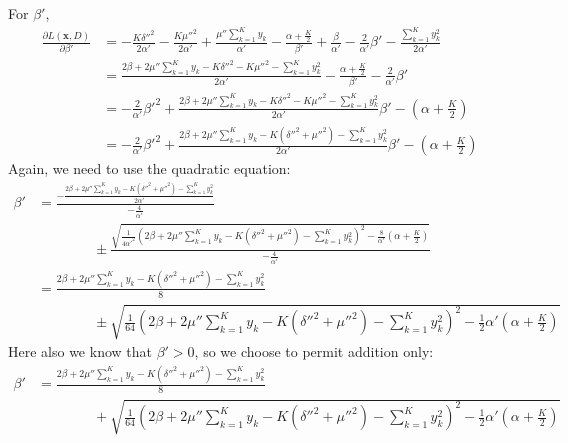 \documentclass[12pt]{article}
\begin{document}
\begin{appendices}
For $\beta'$,
\begin{align}
    \frac{\partial L(\bm{x}, D)}{\partial \beta'} &=
    - \frac{K\delta''^2}{2\alpha'} - \frac{K\mu''^2}{2\alpha'}
    + \frac{\mu''\sum_{k=1}^{K}y_{k}}{\alpha'}
    - \frac{\alpha + \frac{K}{2}}{\beta'}
    + \frac{\beta}{\alpha'} - \frac{2}{\alpha'}\beta'
    - \frac{\sum_{k=1}^{K} y_{k}^2}{2\alpha'}
    \nonumber \\
    &= \frac{2\beta + 2\mu''\sum_{k=1}^{K}y_{k}
    - K\delta''^2 - K\mu''^2
    - \sum_{k=1}^{K} y_{k}^2}{2\alpha'}
    - \frac{\alpha + \frac{K}{2}}{\beta'}
    - \frac{2}{\alpha'}\beta'
    \nonumber \\
    &=
    - \frac{2}{\alpha'}\beta'^2
    + \frac{2\beta + 2\mu''\sum_{k=1}^{K}y_{k}
    - K\delta''^2 - K\mu''^2
    - \sum_{k=1}^{K} y_{k}^2}{2\alpha'}\beta'
    - (\alpha + \frac{K}{2})
    \nonumber \\
    &=
    - \frac{2}{\alpha'}\beta'^2
    + \frac{2\beta + 2\mu''\sum_{k=1}^{K}y_{k}
    - K(\delta''^2 + \mu''^2)
    - \sum_{k=1}^{K} y_{k}^2}{2\alpha'}\beta'
    - (\alpha + \frac{K}{2})
    \nonumber
\end{align}
Again, we need to use the quadratic equation:
\begin{align}
    \beta' &= \frac{- \frac{2\beta + 2\mu''\sum_{k=1}^{K}y_{k} - K(\delta''^2 +
    \mu''^2) - \sum_{k=1}^{K} y_{k}^{2}}{2\alpha'}}{-\frac{4}{\alpha'}}
    \nonumber \\
    &\quad\quad\quad\quad
    \pm
    \frac{\sqrt{\frac{1}{4\alpha'^2}(2\beta + 2\mu''\sum_{k=1}^{K}y_{k} - K(\delta''^2 +
    \mu''^2) - \sum_{k=1}^{K} y_{k}^{2})^2 - \frac{8}{\alpha'}(\alpha +
    \frac{K}{2})}}
    {-\frac{4}{\alpha'}}
    \nonumber \\
    &= \frac{2\beta + 2\mu''\sum_{k=1}^{K}y_{k} - K(\delta''^2 +
    \mu''^2) - \sum_{k=1}^{K} y_{k}^{2}}{8}
    \nonumber \\
    &\quad\quad\quad\quad
    \pm
    \sqrt{\frac{1}{64}(2\beta + 2\mu''\sum_{k=1}^{K}y_{k} - K(\delta''^2 +
    \mu''^2) - \sum_{k=1}^{K} y_{k}^{2})^2 - \frac{1}{2}\alpha'(\alpha +
    \frac{K}{2})}
    \nonumber
\end{align}
Here also we know that $\beta' > 0$, so we choose to permit addition only:
\begin{align}
    \beta' &= \frac{2\beta + 2\mu''\sum_{k=1}^{K}y_{k} - K(\delta''^2 +
    \mu''^2) - \sum_{k=1}^{K} y_{k}^{2}}{8}
    \nonumber \\
    &\quad\quad\quad\quad
    +
    \sqrt{\frac{1}{64}(2\beta + 2\mu''\sum_{k=1}^{K}y_{k} - K(\delta''^2 +
    \mu''^2) - \sum_{k=1}^{K} y_{k}^{2})^2 - \frac{1}{2}\alpha'(\alpha +
    \frac{K}{2})}
    \nonumber
\end{align}
\end{appendices}
\fi

\printbibliography
\end{document}
